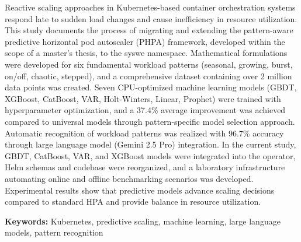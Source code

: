 \documentclass[12pt,a4paper]{article}
\begin{document}
\noindent
Reactive scaling approaches in Kubernetes-based container orchestration systems respond late to sudden load changes and cause inefficiency in resource utilization. This study documents the process of migrating and extending the pattern-aware predictive horizontal pod autoscaler (PHPA) framework, developed within the scope of a master's thesis, to the syswe namespace. Mathematical formulations were developed for six fundamental workload patterns (seasonal, growing, burst, on/off, chaotic, stepped), and a comprehensive dataset containing over 2 million data points was created. Seven CPU-optimized machine learning models (GBDT, XGBoost, CatBoost, VAR, Holt-Winters, Linear, Prophet) were trained with hyperparameter optimization, and a 37.4\% average improvement was achieved compared to universal models through pattern-specific model selection approach. Automatic recognition of workload patterns was realized with 96.7\% accuracy through large language model (Gemini 2.5 Pro) integration. In the current study, GBDT, CatBoost, VAR, and XGBoost models were integrated into the operator, Helm schemas and codebase were reorganized, and a laboratory infrastructure automating online and offline benchmarking scenarios was developed. Experimental results show that predictive models advance scaling decisions compared to standard HPA and provide balance in resource utilization.

\vspace{0.5cm}

\noindent
\textbf{Keywords:} Kubernetes, predictive scaling, machine learning, large language models, pattern recognition
\end{document}
